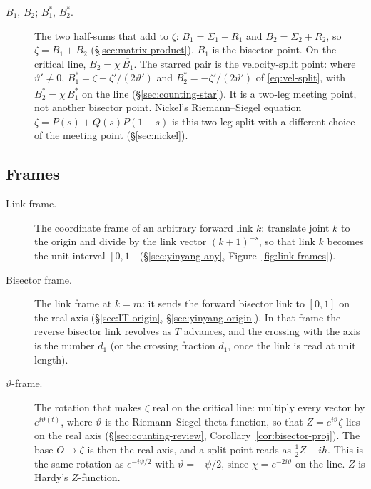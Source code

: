 \documentclass[11pt]{article}
\theoremstyle{definition}
\begin{document}
\begin{description}
\item[$B_1$, $B_2$; $B_1^{\ast}$, $B_2^{\ast}$.]
The two half-sums that add to $\zeta$:
$B_1=\Sigma_1+R_{1}$ and $B_2=\Sigma_2+R_{2}$, so
$\zeta=B_1+B_2$ (\S\ref{sec:matrix-product}).
$B_1$ is the bisector point.
On the critical line, $B_2=\chi\,\overline{B_1}$.
The starred pair is the velocity-split point: where
$\vartheta'\neq0$,
$B_1^{\ast}=\zeta+\zeta'/(2\vartheta')$ and
$B_2^{\ast}=-\zeta'/(2\vartheta')$ of \eqref{eq:vel-split}, with
$B_2^{\ast}=\chi\,\overline{B_1^{\ast}}$ on the line
(\S\ref{sec:counting-star}).
It is a two-leg meeting point, not another bisector point.
Nickel's Riemann--Siegel equation $\zeta=P(s)+Q(s)P(1-s)$ is this
two-leg split with a different choice of the meeting point
(\S\ref{sec:nickel}).
\end{description}

\subsection*{Frames}

\begin{description}
\item[Link frame.]
The coordinate frame of an arbitrary forward link $k$: translate
joint $k$ to the origin and divide by the link vector $(k+1)^{-s}$,
so that link $k$ becomes the unit interval $[0,1]$
(\S\ref{sec:yinyang-any}, Figure~\ref{fig:link-frames}).

\item[Bisector frame.]
The link frame at $k=m$: it sends the forward bisector link to
$[0,1]$ on the real axis
(\S\ref{sec:IT-origin}, \S\ref{sec:yinyang-origin}).
In that frame the reverse bisector link revolves as $T$ advances,
and the crossing with the axis is the number $d_1$
(or the crossing fraction $\hat d_1$, once the link is read at unit
length).

\item[$\vartheta$-frame.]
The rotation that makes $\zeta$ real on the critical line:
multiply every vector by $e^{i\vartheta(t)}$, where $\vartheta$ is
the Riemann--Siegel theta function, so that
$Z=e^{i\vartheta}\zeta$ lies on the real axis
(\S\ref{sec:counting-review}, Corollary~\ref{cor:bisector-proj}).
The base $O\to\zeta$ is then the real axis, and a split point
reads as $\tfrac12 Z+ih$.
This is the same rotation as $e^{-i\psi/2}$ with
$\vartheta=-\psi/2$, since $\chi=e^{-2i\vartheta}$ on the line.
$Z$ is Hardy's $Z$-function.
\end{description}
\end{document}
